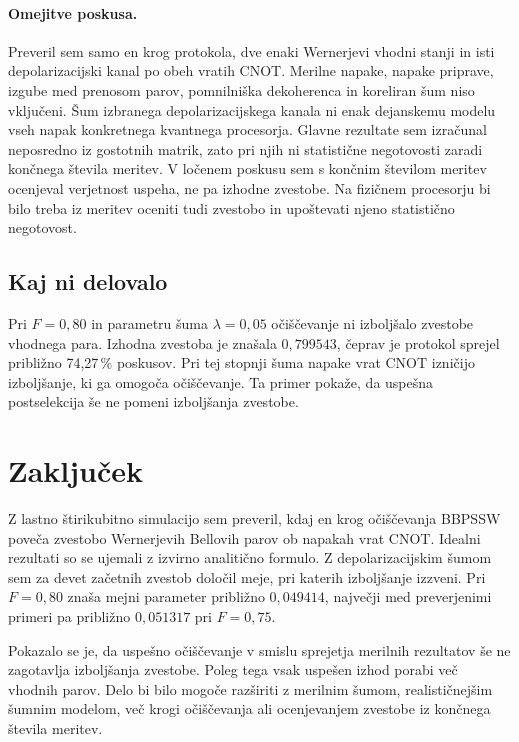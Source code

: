\paragraph{Omejitve poskusa.}
Preveril sem samo en krog protokola, dve enaki Wernerjevi vhodni stanji in isti depolarizacijski kanal po obeh vratih CNOT. Merilne napake, napake priprave, izgube med prenosom parov, pomnilniška dekoherenca in koreliran šum niso vključeni. Šum izbranega depolarizacijskega kanala ni enak dejanskemu modelu vseh napak konkretnega kvantnega procesorja. Glavne rezultate sem izračunal neposredno iz gostotnih matrik, zato pri njih ni statistične negotovosti zaradi končnega števila meritev. V ločenem poskusu sem s končnim številom meritev ocenjeval verjetnost uspeha, ne pa izhodne zvestobe. Na fizičnem procesorju bi bilo treba iz meritev oceniti tudi zvestobo in upoštevati njeno statistično negotovost.

\subsection{Kaj ni delovalo}
\label{g24:sec:neuspehi}

Pri $F=0{,}80$ in parametru šuma $\lambda=0{,}05$ očiščevanje ni izboljšalo zvestobe vhodnega para. Izhodna zvestoba je znašala $0{,}799543$, čeprav je protokol sprejel približno 74,27\,\% poskusov. Pri tej stopnji šuma napake vrat CNOT izničijo izboljšanje, ki ga omogoča očiščevanje. Ta primer pokaže, da uspešna postselekcija še ne pomeni izboljšanja zvestobe.

\section{Zaključek}
\label{g24:sec:zakljucek}

Z lastno štirikubitno simulacijo sem preveril, kdaj en krog očiščevanja BBPSSW poveča zvestobo Wernerjevih Bellovih parov ob napakah vrat CNOT. Idealni rezultati so se ujemali z izvirno analitično formulo. Z depolarizacijskim šumom sem za devet začetnih zvestob določil meje, pri katerih izboljšanje izzveni. Pri $F=0{,}80$ znaša mejni parameter približno $0{,}049414$, največji med preverjenimi primeri pa približno $0{,}051317$ pri $F=0{,}75$.

Pokazalo se je, da uspešno očiščevanje v smislu sprejetja merilnih rezultatov še ne zagotavlja izboljšanja zvestobe. Poleg tega vsak uspešen izhod porabi več vhodnih parov. Delo bi bilo mogoče razširiti z merilnim šumom, realističnejšim šumnim modelom, več krogi očiščevanja ali ocenjevanjem zvestobe iz končnega števila meritev.


